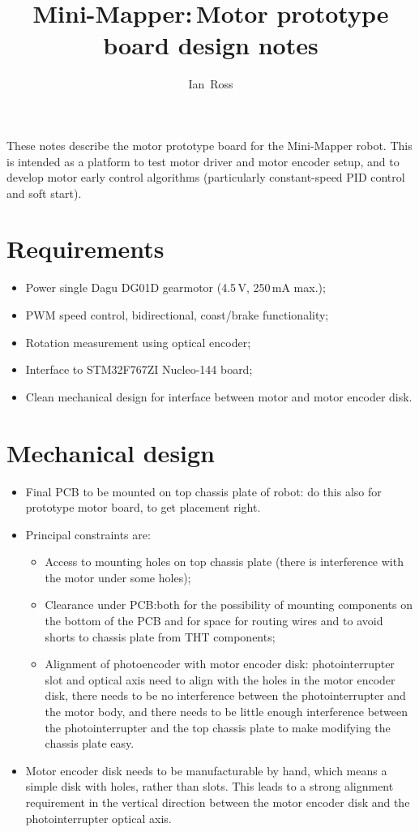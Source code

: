 \documentclass[a4paper,11pt,article]{memoir}
\title{Mini-Mapper:\,Motor prototype board design notes}
\author{Ian~Ross}
\begin{document}
\maketitle

These notes describe the motor prototype board for the Mini-Mapper
robot. This is intended as a platform to test motor driver and motor
encoder setup, and to develop motor early control algorithms
(particularly constant-speed PID control and soft start).


\section*{Requirements}

\begin{itemize}
  \item{Power single Dagu DG01D gearmotor (4.5\,V, 250\,mA max.);}
  \item{PWM speed control, bidirectional, coast/brake functionality;}
  \item{Rotation measurement using optical encoder;}
  \item{Interface to STM32F767ZI Nucleo-144 board;}
  \item{Clean mechanical design for interface between motor and motor
    encoder disk.}
\end{itemize}


\section*{Mechanical design}

\begin{itemize}
  \item{Final PCB to be mounted on top chassis plate of robot: do this
    also for prototype motor board, to get placement right.}
  \item{Principal constraints are:
    \begin{itemize}
      \item{Access to mounting holes on top chassis plate
        (there is interference with the motor under some holes);}
      \item{Clearance under PCB:\@{}both for the possibility of
        mounting components on the bottom of the PCB and for space for
        routing wires and to avoid shorts to chassis plate from THT
        components;}
      \item{Alignment of photoencoder with motor encoder disk:
        photointerrupter slot and optical axis need to align with the
        holes in the motor encoder disk, there needs to be no
        interference between the photointerrupter and the motor body,
        and there needs to be little enough interference between the
        photointerrupter and the top chassis plate to make modifying
        the chassis plate easy.}
  \end{itemize}}
  \item{Motor encoder disk needs to be manufacturable by hand, which
    means a simple disk with holes, rather than slots. This leads to a
    strong alignment requirement in the vertical direction between the
    motor encoder disk and the photointerrupter optical axis.}
\end{itemize}
\end{document}
